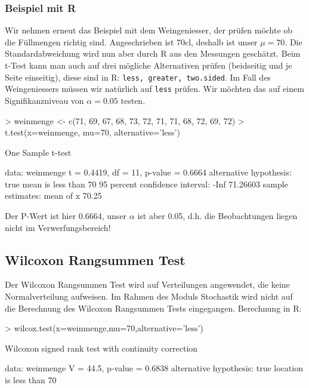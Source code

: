 \subsubsection{Beispiel mit R}
Wir nehmen erneut das Beispiel mit dem Weingeniesser, der prüfen möchte ob die 
Füllmengen richtig sind. Angeschrieben ist 70cl, deshalb ist unser $\mu=70$. 
Die Standardabweichung wird nun aber durch R aus den Messungen geschätzt. 
Beim t-Test kann man auch auf drei mögliche Alternativen prüfen 
(beidseitig und je Seite einseitig), diese sind in R: 
\verb!less, greater, two.sided!. Im Fall des Weingeniessers müssen wir 
natürlich auf \verb!less! prüfen. Wir möchten das auf einem Signifikanzniveau 
von $\alpha=0.05$ testen.
\begin{Schunk}
\begin{Sinput}
> weinmenge <- c(71, 69, 67, 68, 73, 72, 71, 71, 68, 72, 69, 72)
> t.test(x=weinmenge, mu=70, alternative='less')
\end{Sinput}
\begin{Soutput}
	One Sample t-test

data:  weinmenge 
t = 0.4419, df = 11, p-value = 0.6664
alternative hypothesis: true mean is less than 70 
95 percent confidence interval:
     -Inf 71.26603 
sample estimates:
mean of x 
    70.25 
\end{Soutput}
\end{Schunk}

\noindent
Der P-Wert ist hier 0.6664, unser $\alpha$ ist aber 0.05, d.h. 
die Beobachtungen liegen nicht im Verwerfungsbereich!


\subsection{Wilcoxon Rangsummen Test}
Der Wilcoxon Rangsummen Test wird auf Verteilungen angewendet, die keine 
Normalverteilung aufweisen. Im Rahmen des Moduls Stochastik wird nicht auf die 
Berechnung des Wilcoxon Rangsummen Tests eingegangen. Berechnung in R: 
\begin{Schunk}
\begin{Sinput}
> wilcox.test(x=weinmenge,mu=70,alternative='less')
\end{Sinput}
\begin{Soutput}
	Wilcoxon signed rank test with continuity correction

data:  weinmenge 
V = 44.5, p-value = 0.6838
alternative hypothesis: true location is less than 70 
\end{Soutput}
\end{Schunk}

